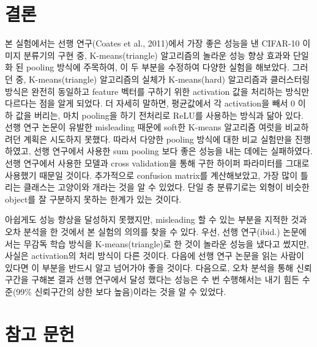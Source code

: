 \documentclass[a4paper,9pt]{article}
\begin{document}
\begin{multicols*}{2}
\section{결론}

본 실험에서는 선행 연구(Coates et al., 2011)에서 가장 좋은 성능을 낸 CIFAR-10 이미지 분류기의 구현 중, K-means(triangle) 알고리즘의 놀라운 성능 향상 효과와 단일화 된 pooling 방식에 주목하여, 이 두 부분을 수정하여 다양한 실험을 해보았다.
그러던 중, K-means(triangle) 알고리즘의 실체가 K-means(hard) 알고리즘과 클러스터링 방식은 완전히 동일하고 feature 벡터를 구하기 위한 activation 값을 처리하는 방식만 다르다는 점을 알게 되었다.
더 자세히 말하면, 평균값에서 각 activation을 빼서 0 이하 값을 버리는, 마치 pooling을 하기 전처리로 ReLU를 사용하는 방식과 닮아 있다.
선행 연구 논문이 유발한 misleading 때문에 soft한 K-means 알고리즘 여럿을 비교하려던 계획은 시도하지 못했다.
따라서 다양한 pooling 방식에 대한 비교 실험만을 진행하였고, 선행 연구에서 사용한 sum pooling 보다 좋은 성능을 내는 데에는 실패하였다.
선행 연구에서 사용한 모델과 cross validation을 통해 구한 하이퍼 파라미터를 그대로 사용했기 때문일 것이다.
추가적으로 confusion matrix를 계산해보았고, 가장 많이 틀리는 클래스는 고양이와 개라는 것을 알 수 있었다.
단일 층 분류기로는 외형이 비슷한 object를 잘 구분하지 못하는 한계가 있는 것이다.

아쉽게도 성능 향상을 달성하지 못했지만, misleading 할 수 있는 부분을 지적한 것과 오차 분석을 한 것에서 본 실험의 의의를 찾을 수 있다.
우선, 선행 연구(ibid.) 논문에서는 무감독 학습 방식을 K-means(triangle)로 한 것이 놀라운 성능을 냈다고 썼지만, 사실은 activation의 처리 방식이 다른 것이다.
다음에 선행 연구 논문을 읽는 사람이 있다면 이 부분을 반드시 알고 넘어가야 좋을 것이다.
다음으로, 오차 분석을 통해 신뢰구간을 구해본 결과 선행 연구에서 달성 했다는 성능은 수 번 수행해서는 내기 힘든 수준(99\% 신뢰구간의 상한 보다 높음)이라는 것을 알 수 있었다.


\section*{참고 문헌}


\end{multicols*}
\end{document}
